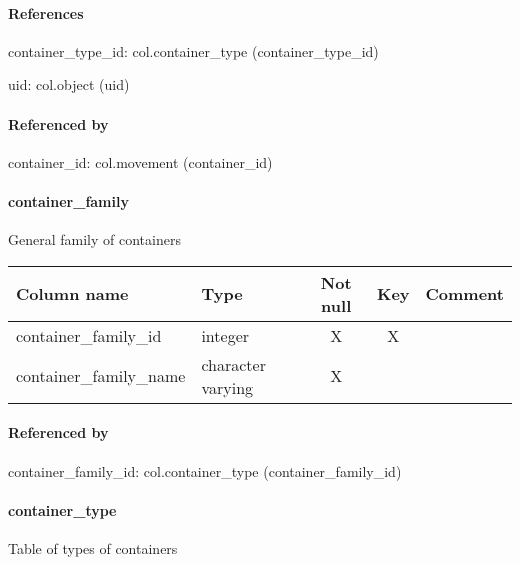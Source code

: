 \paragraph{References}
container\_type\_id: col.container\_type (container\_type\_id)

uid: col.object (uid)

\paragraph{Referenced by}
container\_id: col.movement (container\_id)

\paragraph{container\_family}
General family of containers

\begin{tabular}{|l| p{2cm}|c|c| p{5cm}|}
\hline
Column name & Type & Not null & Key & Comment \\
\hline
container\_family\_id & integer & X & X & \\
container\_family\_name & character varying & X &  & \\
\hline
\end{tabular}
\paragraph{Referenced by}
container\_family\_id: col.container\_type (container\_family\_id)

\paragraph{container\_type}
Table of types of containers

